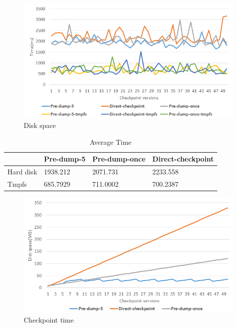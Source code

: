 \begin{figure}[htbp]
\begin{center}
\includegraphics[width=14cm]{figure/50_time.png}
\end{center}
\caption{Disk space}
\label{fig:50_time}
\end{figure}

\begin{table}[htbp]
\centering
\begin{tabular}{|l|l|l|l|}
\hline
          & Pre-dump-5 & Pre-dump-once & Direct-checkpoint \\ \hline
Hard disk & 1938.212   & 2071.731      & 2233.558          \\ \hline
Tmpfs     & 685.7929   & 711.0002      & 700.2387          \\ \hline
\end{tabular}
\caption{Average Time}
\label{table:Average Time}
\end{table}

\begin{figure}[htbp]
\begin{center}
\includegraphics[width=14cm]{figure/50_space.png}
\end{center}
\caption{Checkpoint time}
\label{fig:50_space}
\end{figure}